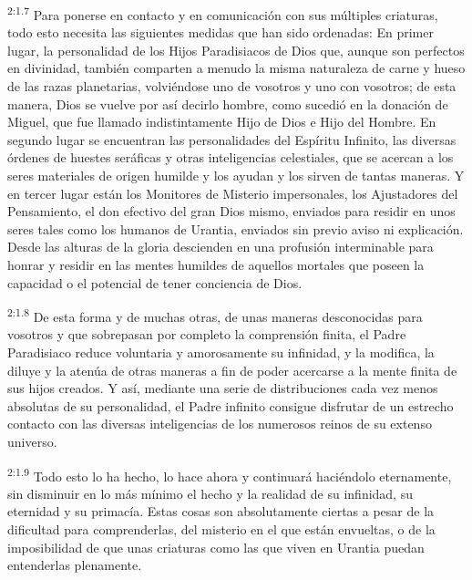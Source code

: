 \par
\textsuperscript{2:1.7} Para ponerse en contacto y en comunicación con sus múltiples criaturas, todo esto necesita las siguientes medidas que han sido ordenadas: En primer lugar, la personalidad de los Hijos Paradisiacos de Dios que, aunque son perfectos en divinidad, también comparten a menudo la misma naturaleza de carne y hueso de las razas planetarias, volviéndose uno de vosotros y uno con vosotros; de esta manera, Dios se vuelve por así decirlo hombre, como sucedió en la donación de Miguel, que fue llamado indistintamente Hijo de Dios e Hijo del Hombre. En segundo lugar se encuentran las personalidades del Espíritu Infinito, las diversas órdenes de huestes seráficas y otras inteligencias celestiales, que se acercan a los seres materiales de origen humilde y los ayudan y los sirven de tantas maneras. Y en tercer lugar están los Monitores de Misterio impersonales, los Ajustadores del Pensamiento, el don efectivo del gran Dios mismo, enviados para residir en unos seres tales como los humanos de Urantia, enviados sin previo aviso ni explicación. Desde las alturas de la gloria descienden en una profusión interminable para honrar y residir en las mentes humildes de aquellos mortales que poseen la capacidad o el potencial de tener conciencia de Dios.

\par
\textsuperscript{2:1.8} De esta forma y de muchas otras, de unas maneras desconocidas para vosotros y que sobrepasan por completo la comprensión finita, el Padre Paradisiaco reduce voluntaria y amorosamente su infinidad, y la modifica, la diluye y la atenúa de otras maneras a fin de poder acercarse a la mente finita de sus hijos creados. Y así, mediante una serie de distribuciones cada vez menos absolutas de su personalidad, el Padre infinito consigue disfrutar de un estrecho contacto con las diversas inteligencias de los numerosos reinos de su extenso universo.

\par
\textsuperscript{2:1.9} Todo esto lo ha hecho, lo hace ahora y continuará haciéndolo eternamente, sin disminuir en lo más mínimo el hecho y la realidad de su infinidad, su eternidad y su primacía. Estas cosas son absolutamente ciertas a pesar de la dificultad para comprenderlas, del misterio en el que están envueltas, o de la imposibilidad de que unas criaturas como las que viven en Urantia puedan entenderlas plenamente.


